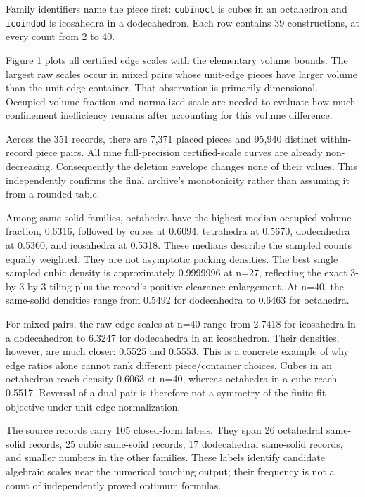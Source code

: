 \documentclass[11pt,a4paper]{article}
\begin{document}
Family identifiers name the piece first: \nolinkurl{cubinoct} is cubes in an octahedron and \nolinkurl{icoindod} is icosahedra in a dodecahedron. Each row contains 39 constructions, at every count from 2 to 40.

Figure 1 plots all certified edge scales with the elementary volume bounds. The largest raw scales occur in mixed pairs whose unit-edge pieces have larger volume than the unit-edge container. That observation is primarily dimensional. Occupied volume fraction and normalized scale are needed to evaluate how much confinement inefficiency remains after accounting for this volume difference.

Across the 351 records, there are 7,371 placed pieces and 95,940 distinct within-record piece pairs. All nine full-precision certified-scale curves are already non-decreasing. Consequently the deletion envelope changes none of their values. This independently confirms the final archive's monotonicity rather than assuming it from a rounded table.

Among same-solid families, octahedra have the highest median occupied volume fraction, 0.6316, followed by cubes at 0.6094, tetrahedra at 0.5670, dodecahedra at 0.5360, and icosahedra at 0.5318. These medians describe the sampled counts equally weighted. They are not asymptotic packing densities. The best single sampled cubic density is approximately 0.9999996 at n=27, reflecting the exact 3-by-3-by-3 tiling plus the record's positive-clearance enlargement. At n=40, the same-solid densities range from 0.5492 for dodecahedra to 0.6463 for octahedra.

For mixed pairs, the raw edge scales at n=40 range from 2.7418 for icosahedra in a dodecahedron to 6.3247 for dodecahedra in an icosahedron. Their densities, however, are much closer: 0.5525 and 0.5553. This is a concrete example of why edge ratios alone cannot rank different piece/container choices. Cubes in an octahedron reach density 0.6063 at n=40, whereas octahedra in a cube reach 0.5517. Reversal of a dual pair is therefore not a symmetry of the finite-fit objective under unit-edge normalization.

The source records carry 105 closed-form labels. They span 26 octahedral same-solid records, 25 cubic same-solid records, 17 dodecahedral same-solid records, and smaller numbers in the other families. These labels identify candidate algebraic scales near the numerical touching output; their frequency is not a count of independently proved optimum formulas.
\end{document}
